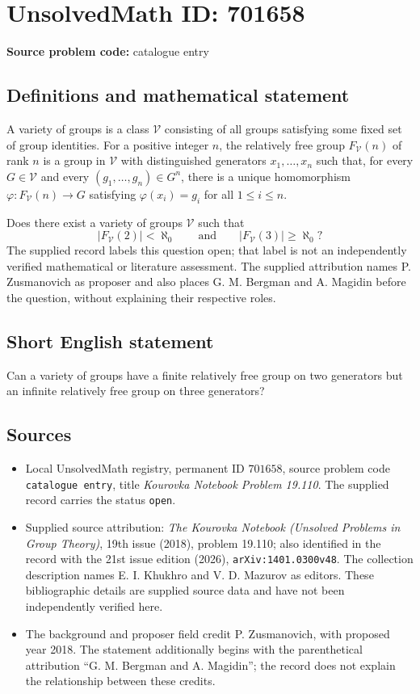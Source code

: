 \documentclass[11pt]{article}
\begin{document}
\section*{UnsolvedMath ID: 701658}
\textbf{Source problem code:} catalogue entry
\subsection{Definitions and mathematical statement}
A variety of groups is a class \(\mathcal V\) consisting of all groups satisfying some fixed set of group identities. For a positive integer \(n\), the relatively free group \(F_{\mathcal V}(n)\) of rank \(n\) is a group in \(\mathcal V\) with distinguished generators \(x_1,\ldots,x_n\) such that, for every \(G\in\mathcal V\) and every \((g_1,\ldots,g_n)\in G^n\), there is a unique homomorphism \(\varphi:F_{\mathcal V}(n)\to G\) satisfying \(\varphi(x_i)=g_i\) for all \(1\leq i\leq n\).

Does there exist a variety of groups \(\mathcal V\) such that
\[
|F_{\mathcal V}(2)|<\aleph_0
\qquad\text{and}\qquad
|F_{\mathcal V}(3)|\geq\aleph_0?
\]
The supplied record labels this question open; that label is not an independently verified mathematical or literature assessment. The supplied attribution names P. Zusmanovich as proposer and also places G. M. Bergman and A. Magidin before the question, without explaining their respective roles.
\subsection{Short English statement}
Can a variety of groups have a finite relatively free group on two generators but an infinite relatively free group on three generators?
\subsection{Sources}
\begin{itemize}
\item Local UnsolvedMath registry, permanent ID \(701658\), source problem code \texttt{catalogue entry}, title \emph{Kourovka Notebook Problem 19.110}. The supplied record carries the status \texttt{open}.
\item Supplied source attribution: \emph{The Kourovka Notebook (Unsolved Problems in Group Theory)}, 19th issue (2018), problem 19.110; also identified in the record with the 21st issue edition (2026), \texttt{arXiv:1401.0300v48}. The collection description names E. I. Khukhro and V. D. Mazurov as editors. These bibliographic details are supplied source data and have not been independently verified here.
\item The background and proposer field credit P. Zusmanovich, with proposed year 2018. The statement additionally begins with the parenthetical attribution ``G. M. Bergman and A. Magidin''; the record does not explain the relationship between these credits.
\end{itemize}
\end{document}

